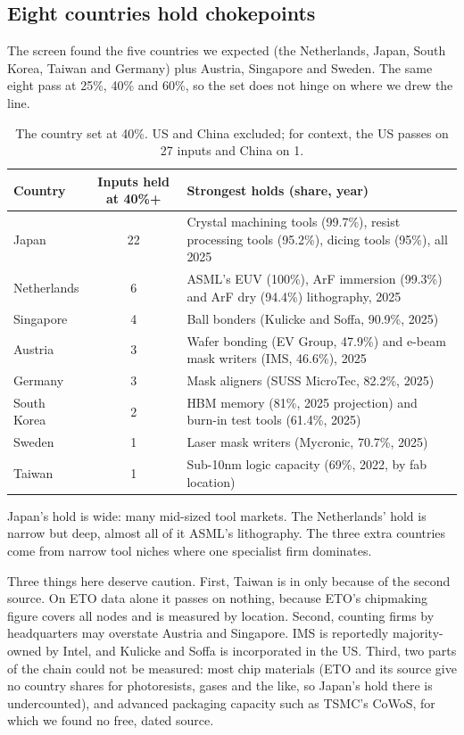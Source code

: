 \documentclass[11pt]{article}
\begin{document}
\subsection{Eight countries hold chokepoints}

The screen found the five countries we expected (the Netherlands, Japan, South Korea, Taiwan and Germany) plus Austria, Singapore and Sweden. The same eight pass at 25\%, 40\% and 60\%, so the set does not hinge on where we drew the line.

\begin{table}[htbp]
\centering\small
\begin{tabularx}{\linewidth}{@{}l c X@{}}
\toprule
\textbf{Country} & \textbf{Inputs held at 40\%+} & \textbf{Strongest holds (share, year)}\\
\midrule
Japan & 22 & Crystal machining tools (99.7\%), resist processing tools (95.2\%), dicing tools (95\%), all 2025\\
Netherlands & 6 & ASML's EUV (100\%), ArF immersion (99.3\%) and ArF dry (94.4\%) lithography, 2025\\
Singapore & 4 & Ball bonders (Kulicke and Soffa, 90.9\%, 2025)\\
Austria & 3 & Wafer bonding (EV Group, 47.9\%) and e-beam mask writers (IMS, 46.6\%), 2025\\
Germany & 3 & Mask aligners (SUSS MicroTec, 82.2\%, 2025)\\
South Korea & 2 & HBM memory (81\%, 2025 projection) and burn-in test tools (61.4\%, 2025)\\
Sweden & 1 & Laser mask writers (Mycronic, 70.7\%, 2025)\\
Taiwan & 1 & Sub-10nm logic capacity (69\%, 2022, by fab location)\\
\bottomrule
\end{tabularx}
\caption{The country set at 40\%. US and China excluded; for context, the US passes on 27 inputs and China on 1.}
\label{tab:countries}
\end{table}

Japan's hold is wide: many mid-sized tool markets. The Netherlands' hold is narrow but deep, almost all of it ASML's lithography. The three extra countries come from narrow tool niches where one specialist firm dominates.

Three things here deserve caution. First, Taiwan is in only because of the second source. On ETO data alone it passes on nothing, because ETO's chipmaking figure covers all nodes and is measured by location. Second, counting firms by headquarters may overstate Austria and Singapore. IMS is reportedly majority-owned by Intel, and Kulicke and Soffa is incorporated in the US. Third, two parts of the chain could not be measured: most chip materials (ETO and its source give no country shares for photoresists, gases and the like, so Japan's hold there is undercounted), and advanced packaging capacity such as TSMC's CoWoS, for which we found no free, dated source.
\end{document}
